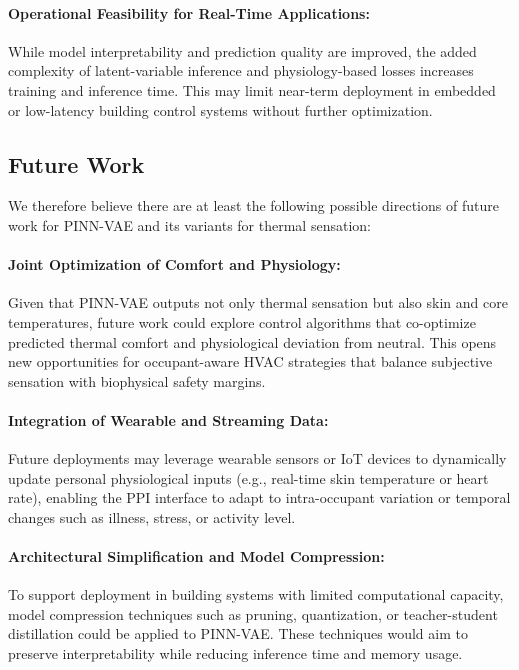 \paragraph{Operational Feasibility for Real-Time Applications:} While model interpretability and prediction quality are improved, the added complexity of latent-variable inference and physiology-based losses increases training and inference time. This may limit near-term deployment in embedded or low-latency building control systems without further optimization.


\subsection{Future Work}
\noindent We therefore believe there are at least the following possible directions of future work for PINN-VAE and its variants for thermal sensation:
\paragraph{Joint Optimization of Comfort and Physiology:} Given that PINN-VAE outputs not only thermal sensation but also skin and core temperatures, future work could explore control algorithms that co-optimize predicted thermal comfort and physiological deviation from neutral. This opens new opportunities for occupant-aware HVAC strategies that balance subjective sensation with biophysical safety margins.

\paragraph{Integration of Wearable and Streaming Data:} Future deployments may leverage wearable sensors or IoT devices to dynamically update personal physiological inputs (e.g., real-time skin temperature or heart rate), enabling the PPI interface to adapt to intra-occupant variation or temporal changes such as illness, stress, or activity level.

\paragraph{Architectural Simplification and Model Compression:} To support deployment in building systems with limited computational capacity, model compression techniques such as pruning, quantization, or teacher-student distillation could be applied to PINN-VAE. These techniques would aim to preserve interpretability while reducing inference time and memory usage.

